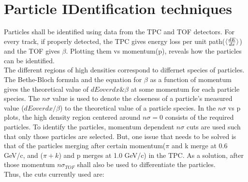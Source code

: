 \documentclass[ALICE,manyauthors]{ALICE_analysis_notes}
\begin{document}
\section[PID techniques]{Particle IDentification techniques}
Particles shall be identified using data from the TPC and TOF detectors. For every track, if properly detected, the TPC gives energy loss per unit path($\langle{ dE \over dx}\rangle$) and the TOF gives $\beta$. Plotting them vs momentum(p), reveals how the particles can be identified.\\
The different regions of high densities correspond to differnet species of particles. The Bethe-Bloch formula and the equation for $\beta$ as a function of momentum gives the theoretical value of ${dE}over{dx} \& \beta$ at some momentum for each particle species.
The $n\sigma$ value is used to denote the closeness of  a particle's measured value (${dE}over{dx} / \beta$) to the theoretical value of a particle species. In the $n\sigma$ vs p plots, the high density region centered around $n\sigma=0$ consists of the required particles. 
To identify the particles, momentum dependent $n\sigma$ cuts are used such that only those particles are selected.
But, one issue that needs to be solved is that of the particles merging after certain momentum($\pi$ and k merge at 0.6 GeV/c, and ($\pi+k$) and p merges at 1.0 GeV/c) in the TPC. As a solution, after those momentum $n\sigma_{TOF}$ shall also be used to differentiate the particles.
\\
Thus, the cuts currently used are:
\end{document}
